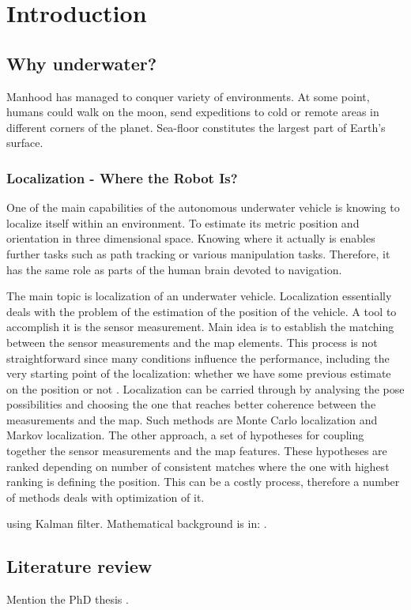 \chapter{Introduction} \label{chap:intro}

\section{Why underwater?} \label{sect:thefirst}

Manhood has managed to conquer variety of environments. At some point, humans could walk on the moon, send expeditions to cold or remote areas in different corners of the planet. Sea-floor constitutes the largest part of Earth's surface.
\subsection{Localization - Where the Robot Is?}
One of the main capabilities of the autonomous underwater vehicle is knowing to localize itself within an environment. To estimate its metric position and orientation in three dimensional space. Knowing where it actually is enables further tasks such as path tracking or various manipulation tasks. Therefore, it has the same role as parts of the human brain devoted to navigation.  


The main topic is localization of an underwater vehicle. Localization essentially deals with the problem of the estimation of the position of the vehicle. A tool to accomplish it is the sensor measurement. Main idea is to establish the matching between the sensor measurements and the map elements. This process is not straightforward since many conditions influence the performance, including the very starting point of the localization: whether we have some previous estimate on the position or not \cite{ribas10}. Localization can be carried through by analysing the pose possibilities and choosing the one that reaches better coherence between the measurements and the map. Such methods are Monte Carlo localization and Markov localization. The other approach, a set of hypotheses for coupling together the sensor measurements and the map features. These hypotheses are ranked depending on number of consistent matches where the one with highest ranking is defining the position. This can be a costly process, therefore a number of methods deals with optimization of it. 

 using Kalman filter. Mathematical background is in: \cite{Maybeck79}.

\section{Literature review} \label{sect:lit-rev}
Mention the PhD thesis \cite{ribas10}.

